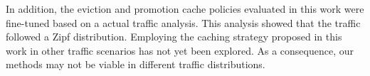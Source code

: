 In addition, the eviction and promotion cache policies evaluated in this work were fine-tuned based on a actual traffic analysis.
This analysis showed that the traffic followed a Zipf distribution.
Employing the caching strategy proposed in this work in other traffic scenarios has not yet been explored.
As a consequence, our methods may not be viable in different traffic distributions. 